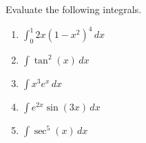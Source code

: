 \documentclass[12pt]{article}
\newcommand{\di}{\displaystyle}
\begin{document}
\newpage
Evaluate the following integrals.
  \begin{enumerate}
  \item $\di \int_0^1 2x(1-x^2)^4\,dx$
  
  \vspace{1in}
  
 \item $\di \int \tan^2(x)\,dx$

 \vspace{1in}



 \item $\di \int x^3e^x\,dx$
 
 \vspace{1.5in}
 
 \item $\di \int e^{2x}\sin(3x)\,dx$
 
 \vspace{1.5in}
 
 \item $\di \int \sec^5(x)\,dx$
  \end{enumerate}

\vspace{1.5in} 
  
\end{document}
